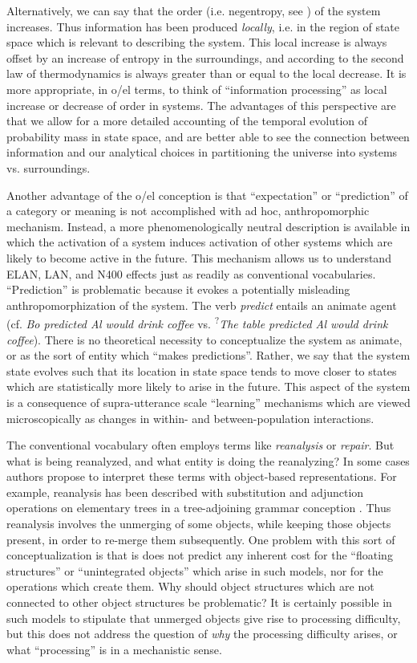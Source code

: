 Alternatively, we can say that the order (i.e. negentropy, see \citealt{Schrödinger1944}) of the system increases. Thus information has been produced \textit{locally}, i.e. in the region of state space which is relevant to describing the system. This local increase is always offset by an increase of entropy in the surroundings, and according to the second law of thermodynamics is always greater than or equal to the local decrease. It is more appropriate, in o/el terms, to think of “information processing” as local increase or decrease of order in systems. The advantages of this perspective are that we allow for a more detailed accounting of the temporal evolution of probability mass in state space, and are better able to see the connection between information and our analytical choices in partitioning the universe into systems vs. surroundings. 

Another advantage of the o/el conception is that “expectation” or “prediction” of a category or meaning is not accomplished with ad hoc, anthropomorphic mechanism. Instead, a more phenomenologically neutral description is available in which the activation of a system induces activation of other systems which are likely to become active in the future. This mechanism allows us to understand ELAN, LAN, and N400 effects just as readily as conventional vocabularies. “Prediction” is problematic because it evokes a potentially misleading anthropomorphization of the system. The verb \textit{predict} entails an animate agent (cf. \textit{Bo predicted Al would drink coffee} vs. \textsuperscript{?}\textit{The table predicted Al would drink coffee}). There is no theoretical necessity to conceptualize the system as animate, or as the sort of entity which “makes predictions”. Rather, we say that the system state evolves such that its location in state space tends to move closer to states which are statistically more likely to arise in the future. This aspect of the system is a consequence of supra-utterance scale “learning” mechanisms which are viewed microscopically as changes in within- and between-population interactions.

The conventional vocabulary often employs terms like \textit{reanalysis} or \textit{repair}. But what is being reanalyzed, and what entity is doing the reanalyzing? In some cases authors propose to interpret these terms with object-based representations. For example, reanalysis has been described with substitution and adjunction operations on elementary trees in a tree-adjoining grammar conception \citep{FFerreiraEtAl2004}. Thus reanalysis involves the unmerging of some objects, while keeping those objects present, in order to re-merge them subsequently. One problem with this sort of conceptualization is that is does not predict any inherent cost for the “floating structures” or “unintegrated objects” which arise in such models, nor for the operations which create them. Why should object structures which are not connected to other object structures be problematic? It is certainly possible in such models to stipulate that unmerged objects give rise to processing difficulty, but this does not address the question of \textit{why} the processing difficulty arises, or what “processing” is in a mechanistic sense.

